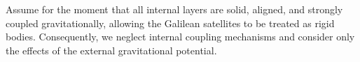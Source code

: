 \documentclass[lineno, pdflatex,sn-mathphys-ay]{sn-jnl}
\theoremstyle{thmstyleone}%
\theoremstyle{thmstyletwo}%
\theoremstyle{thmstylethree}%
\begin{document}
Assume for the moment that all internal layers are solid, aligned, and strongly coupled gravitationally, allowing the Galilean satellites to be treated as rigid bodies. Consequently, we neglect internal coupling mechanisms and consider only the effects of the external gravitational potential.
%
\end{document}
